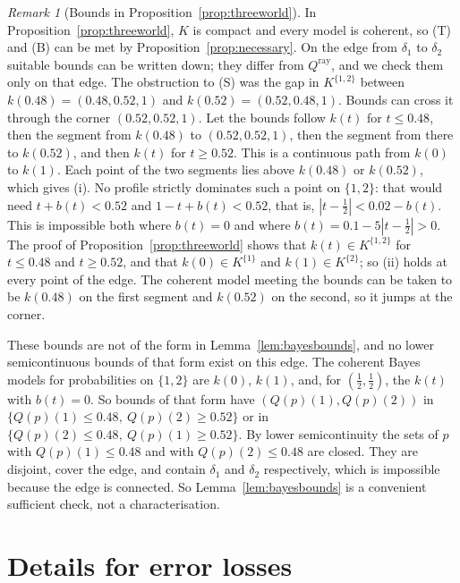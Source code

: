 \documentclass[11pt]{article}
\theoremstyle{definition}
\theoremstyle{remark}
\newtheorem{remark}[theorem]{Remark}
\begin{document}
\begin{remark}[Bounds in Proposition~\ref{prop:threeworld}]\label{rem:threeworld-bounds}
In Proposition~\ref{prop:threeworld}, $K$ is compact and every model is coherent, so (T) and (B) can be met by Proposition~\ref{prop:necessary}. On the edge from $\delta_1$ to $\delta_2$ suitable bounds can be written down; they differ from $Q^{\mathrm{ray}}$, and we check them only on that edge. The obstruction to (S) was the gap in $K^{\{1,2\}}$ between $k(0.48)=(0.48,0.52,1)$ and $k(0.52)=(0.52,0.48,1)$. Bounds can cross it through the corner $(0.52,0.52,1)$. Let the bounds follow $k(t)$ for $t\le0.48$, then the segment from $k(0.48)$ to $(0.52,0.52,1)$, then the segment from there to $k(0.52)$, and then $k(t)$ for $t\ge0.52$. This is a continuous path from $k(0)$ to $k(1)$. Each point of the two segments lies above $k(0.48)$ or $k(0.52)$, which gives (i). No profile strictly dominates such a point on $\{1,2\}$: that would need $t+b(t)<0.52$ and $1-t+b(t)<0.52$, that is, $|t-\tfrac12|<0.02-b(t)$. This is impossible both where $b(t)=0$ and where $b(t)=0.1-5|t-\tfrac12|>0$. The proof of Proposition~\ref{prop:threeworld} shows that $k(t)\in K^{\{1,2\}}$ for $t\le0.48$ and $t\ge0.52$, and that $k(0)\in K^{\{1\}}$ and $k(1)\in K^{\{2\}}$; so (ii) holds at every point of the edge. The coherent model meeting the bounds can be taken to be $k(0.48)$ on the first segment and $k(0.52)$ on the second, so it jumps at the corner.

These bounds are not of the form in Lemma~\ref{lem:bayesbounds}, and no lower semicontinuous bounds of that form exist on this edge. The coherent Bayes models for probabilities on $\{1,2\}$ are $k(0)$, $k(1)$, and, for $(\tfrac12,\tfrac12)$, the $k(t)$ with $b(t)=0$. So bounds of that form have $(Q(p)(1),Q(p)(2))$ in $\{Q(p)(1)\le0.48,\ Q(p)(2)\ge0.52\}$ or in $\{Q(p)(2)\le0.48,\ Q(p)(1)\ge0.52\}$. By lower semicontinuity the sets of $p$ with $Q(p)(1)\le0.48$ and with $Q(p)(2)\le0.48$ are closed. They are disjoint, cover the edge, and contain $\delta_1$ and $\delta_2$ respectively, which is impossible because the edge is connected. So Lemma~\ref{lem:bayesbounds} is a convenient sufficient check, not a characterisation.
\end{remark}

\section{Details for error losses}\label{sec:tieproof}
\end{document}
